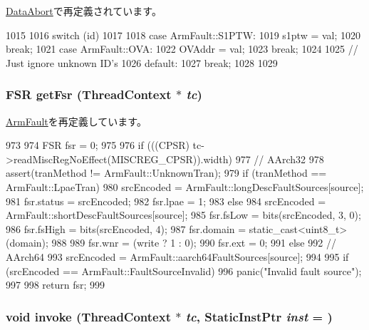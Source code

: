 \hyperlink{classArmISA_1_1DataAbort_a284956f8d8ec0f18434d857ae44c6a6c}{DataAbort}で再定義されています。


\begin{DoxyCode}
1015 {
1016     switch (id)
1017     {
1018       case ArmFault::S1PTW:
1019         s1ptw = val;
1020         break;
1021       case ArmFault::OVA:
1022         OVAddr = val;
1023         break;
1024 
1025       // Just ignore unknown ID's
1026       default:
1027         break;
1028     }
1029 }
\end{DoxyCode}
\hypertarget{classArmISA_1_1AbortFault_abae0f5c90ba0a6f56bc8df45dbd5861b}{
\subsubsection[{getFsr}]{\setlength{\rightskip}{0pt plus 5cm}FSR getFsr ({\bf ThreadContext} $\ast$ {\em tc})}}
\label{classArmISA_1_1AbortFault_abae0f5c90ba0a6f56bc8df45dbd5861b}


\hyperlink{classArmISA_1_1ArmFault_a48f7b7354d7dcf9850a65f9f433c4871}{ArmFault}を再定義しています。


\begin{DoxyCode}
973 {
974     FSR fsr = 0;
975 
976     if (((CPSR) tc->readMiscRegNoEffect(MISCREG_CPSR)).width) {
977         // AArch32
978         assert(tranMethod != ArmFault::UnknownTran);
979         if (tranMethod == ArmFault::LpaeTran) {
980             srcEncoded = ArmFault::longDescFaultSources[source];
981             fsr.status = srcEncoded;
982             fsr.lpae   = 1;
983         } else {
984             srcEncoded = ArmFault::shortDescFaultSources[source];
985             fsr.fsLow  = bits(srcEncoded, 3, 0);
986             fsr.fsHigh = bits(srcEncoded, 4);
987             fsr.domain = static_cast<uint8_t>(domain);
988         }
989         fsr.wnr = (write ? 1 : 0);
990         fsr.ext = 0;
991     } else {
992         // AArch64
993         srcEncoded = ArmFault::aarch64FaultSources[source];
994     }
995     if (srcEncoded == ArmFault::FaultSourceInvalid) {
996         panic("Invalid fault source\n");
997     }
998     return fsr;
999 }
\end{DoxyCode}
\hypertarget{classArmISA_1_1AbortFault_a2bd783b42262278d41157d428e1f8d6f}{
\subsubsection[{invoke}]{\setlength{\rightskip}{0pt plus 5cm}void invoke ({\bf ThreadContext} $\ast$ {\em tc}, \/  {\bf StaticInstPtr} {\em inst} = {})}}
\label{classArmISA_1_1AbortFault_a2bd783b42262278d41157d428e1f8d6f}



